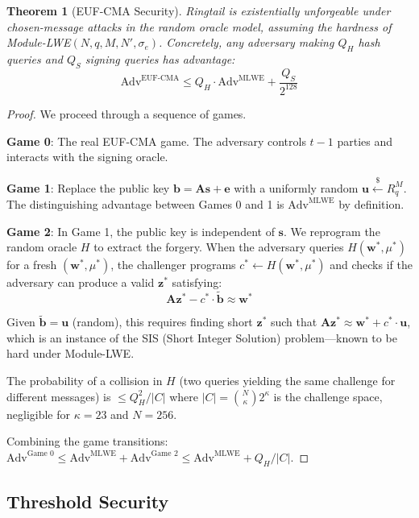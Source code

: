 \documentclass[11pt,a4paper]{article}
\newtheorem{theorem}{Theorem}[section]
\begin{document}
\begin{theorem}[EUF-CMA Security]
\label{thm:euf-cma}
Ringtail is existentially unforgeable under chosen-message attacks in the random oracle
model, assuming the hardness of Module-LWE$(N, q, M, N', \sigma_e)$. Concretely, any
adversary making $Q_H$ hash queries and $Q_S$ signing queries has advantage:
\[
\text{Adv}^{\text{EUF-CMA}} \leq Q_H \cdot \text{Adv}^{\text{MLWE}} + \frac{Q_S}{2^{128}}
\]
\end{theorem}

\begin{proof}
We proceed through a sequence of games.

\textbf{Game 0}: The real EUF-CMA game. The adversary controls $t-1$ parties and
interacts with the signing oracle.

\textbf{Game 1}: Replace the public key $\mathbf{b} = \mathbf{A}\mathbf{s} + \mathbf{e}$
with a uniformly random $\mathbf{u} \stackrel{\$}{\leftarrow} R_q^M$. The distinguishing
advantage between Games 0 and 1 is $\text{Adv}^{\text{MLWE}}$ by definition.

\textbf{Game 2}: In Game 1, the public key is independent of $\mathbf{s}$. We reprogram
the random oracle $H$ to extract the forgery. When the adversary queries $H(\mathbf{w}^*, \mu^*)$
for a fresh $(\mathbf{w}^*, \mu^*)$, the challenger programs $c^* \gets H(\mathbf{w}^*, \mu^*)$ and
checks if the adversary can produce a valid $\mathbf{z}^*$ satisfying:
\[
\mathbf{A}\mathbf{z}^* - c^* \cdot \tilde{\mathbf{b}} \approx \mathbf{w}^*
\]

Given $\tilde{\mathbf{b}} = \mathbf{u}$ (random), this requires finding short $\mathbf{z}^*$
such that $\mathbf{A}\mathbf{z}^* \approx \mathbf{w}^* + c^* \cdot \mathbf{u}$, which
is an instance of the SIS (Short Integer Solution) problem---known to be hard under
Module-LWE.

The probability of a collision in $H$ (two queries yielding the same challenge for
different messages) is $\leq Q_H^2 / |C|$ where $|C| = \binom{N}{\kappa} 2^\kappa$
is the challenge space, negligible for $\kappa = 23$ and $N = 256$.

Combining the game transitions:
$\text{Adv}^{\text{Game 0}} \leq \text{Adv}^{\text{MLWE}} + \text{Adv}^{\text{Game 2}} \leq \text{Adv}^{\text{MLWE}} + Q_H / |C|$.
\end{proof}

\subsection{Threshold Security}
\end{document}
